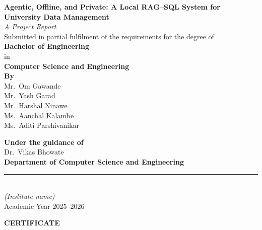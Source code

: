 \documentclass[11pt,a4paper,oneside]{report}
\newcommand{\ReportTitle}{Agentic, Offline, and Private: A Local RAG--SQL System for University Data Management}
\begin{document}
\pagestyle{empty}

\begin{titlepage}
\begin{center}
\vspace*{1.2cm}
{\Large \bfseries \ReportTitle}\\[0.6cm]
{\normalsize \itshape A Project Report}\\[1.8cm]

{\normalsize Submitted in partial fulfilment of the requirements for the degree of}\\[0.2cm]
{\normalsize \bfseries Bachelor of Engineering}\\
{\normalsize in}\\
{\normalsize \bfseries Computer Science and Engineering}\\[1.6cm]

{\normalsize \bfseries By}\\[0.4cm]
{\normalsize
Mr.\ Om Gawande \\
Mr.\ Yash Garad \\
Mr.\ Harshal Ninawe \\
Ms.\ Aanchal Kalambe \\
Ms.\ Aditi Parshivanikar \\
}
\vspace{0.4cm}

{\normalsize \bfseries Under the guidance of}\\[0.3cm]
{\normalsize Dr.\ Vikas Bhowate}\\[1.6cm]

{\normalsize \bfseries Department of Computer Science and Engineering}\\[0.3cm]
\rule{6.5cm}{0.4pt}\\
{\small \itshape (Institute name)}\\[1.2cm]

{\normalsize Academic Year 2025--2026}
\end{center}
\end{titlepage}

\thispagestyle{empty}
\begin{center}
{\Large \bfseries CERTIFICATE}
\end{center}
\vspace{1cm}
\end{document}
